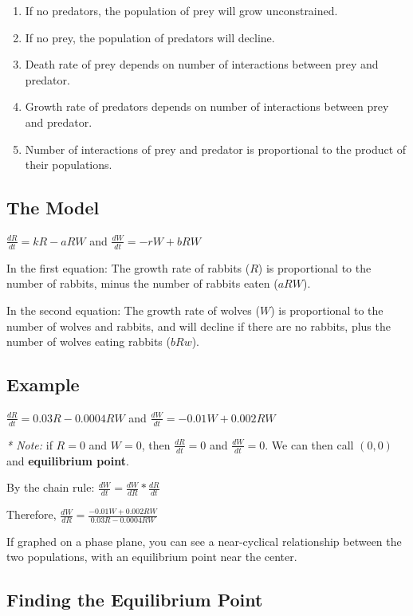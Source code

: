 \documentclass{article}
\begin{document}
\begin{enumerate}
    \item If no predators, the population of prey will grow unconstrained.
    \item If no prey, the population of predators will decline.
    \item Death rate of prey depends on number of interactions between prey and predator.
    \item Growth rate of predators depends on number of interactions between prey and predator.
    \item Number of interactions of prey and predator is proportional to the product of their populations.
\end{enumerate}

\subsection{The Model}

$\frac{dR}{dt} = kR - aRW$ and $\frac{dW}{dt} = -rW + bRW$

In the first equation: The growth rate of rabbits ($R$) is proportional to the number of rabbits, minus the number of rabbits eaten ($aRW$).

In the second equation: The growth rate of wolves ($W$) is proportional to the number of wolves and rabbits, and will decline if there are no rabbits, plus the number of wolves eating rabbits ($bRw$).

\subsection{Example}

$\frac{dR}{dt} = 0.03R - 0.0004RW$ and $\frac{dW}{dt} = -0.01W + 0.002RW$

\textit{* Note:} if $R=0$ and $W=0$, then $\frac{dR}{dt} = 0$ and $\frac{dW}{dt} = 0$. We can then call $(0,0)$ and \textbf{equilibrium point}.

By the chain rule: $\frac{dW}{dt} = \frac{dW}{dR}*\frac{dR}{dt}$

Therefore, $\frac{dW}{dR} = \frac{-0.01W + 0.002RW}{0.03R - 0.0004RW}$

If graphed on a phase plane, you can see a near-cyclical relationship between the two populations, with an equilibrium point near the center.

\subsection{Finding the Equilibrium Point}
\end{document}
